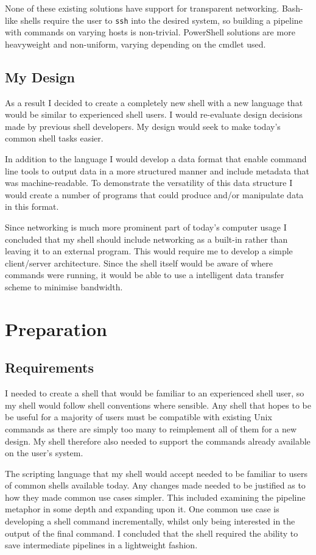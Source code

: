 \documentclass[12pt,twoside,notitlepage]{report}
\begin{document}
None of these existing solutions have support for transparent
networking. Bash-like shells require the user to {\tt ssh} into the
desired system, so building a pipeline with commands on varying hosts
is non-trivial. PowerShell solutions are more heavyweight and
non-uniform, varying depending on the cmdlet used.

\section{My Design}
As a result I decided to create a completely new shell with a new
language that would be similar to experienced shell users. I would
re-evaluate design decisions made by previous shell developers. My
design would seek to make today's common shell tasks easier.

In addition to the language I would develop a data format that enable
command line tools to output data in a more structured manner and
include metadata that was machine-readable. To demonstrate the
versatility of this data structure I would create a number of programs
that could produce and/or manipulate data in this format.

Since networking is much more prominent part of today's computer usage
I concluded that my shell should include networking as a built-in
rather than leaving it to an external program. This would require me
to develop a simple client/server architecture. Since the shell itself
would be aware of where commands were running, it would be able to use
a intelligent data transfer scheme to minimise bandwidth.

\cleardoublepage

\chapter{Preparation}

\section{Requirements}
I needed to create a shell that would be familiar to an experienced
shell user, so my shell would follow shell conventions where
sensible. Any shell that hopes to be be useful for a majority of users
must be compatible with existing Unix commands as there are simply too
many to reimplement all of them for a new design. My shell therefore
also needed to support the commands already available on the user's
system.

The scripting language that my shell would accept needed to be
familiar to users of common shells available today. Any changes made
needed to be justified as to how they made common use cases
simpler. This included examining the pipeline metaphor in some depth
and expanding upon it. One common use case is developing a shell
command incrementally, whilst only being interested in the output of
the final command. I concluded that the shell required the ability to
save intermediate pipelines in a lightweight fashion.
\end{document}
